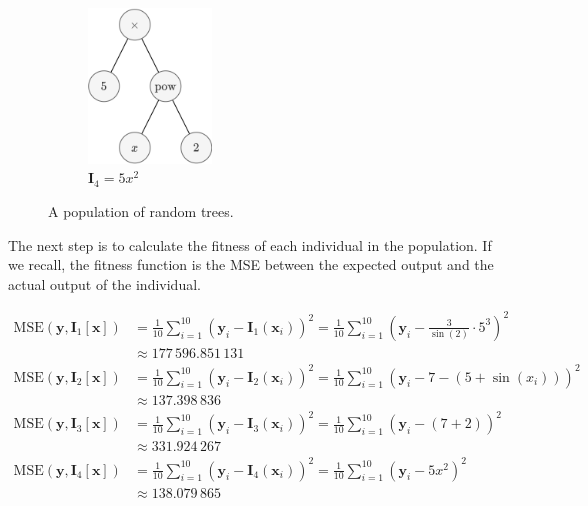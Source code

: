 \begin{figure}[ht!]
    \begin{subfigure}[t]{0.4\textwidth}
      \centering
      \includegraphics[height=4.125cm]{img/theoretical_framework/GP Initial Population 4.png}
      \caption{\(\mathbf{I}_4 = 5x^2\)}
      \label{fig:genetic_programming:initialization:population:4}
    \end{subfigure}
    \caption{A population of random trees.}
    \label{fig:genetic_programming:initialization:population}
  \end{figure}

  The next step is to calculate the fitness of each individual in the
  population.
  If we recall, the fitness function is the MSE between the expected output and
  the actual output of the individual.

  \begin{align*}
    \mathrm{MSE}(\mathbf{y}, \mathbf{I}_1[\mathbf{x}])
      & = \frac{1}{10} \sum_{i=1}^{10} (\mathbf{y}_i - \mathbf{I}_1(\mathbf{x}_i))^2
        = \frac{1}{10} \sum_{i=1}^{10} \left(
          \mathbf{y}_i - \frac{3}{\sin(2)} \cdot 5^3\right)^2 \\
      & \approx 177\,596.851\,131  \\
    \mathrm{MSE}(\mathbf{y}, \mathbf{I}_2[\mathbf{x}])
      & = \frac{1}{10} \sum_{i=1}^{10} (\mathbf{y}_i - \mathbf{I}_2(\mathbf{x}_i))^2
        = \frac{1}{10} \sum_{i=1}^{10} \left(
          \mathbf{y}_i - 7 - (5 + \sin(x_i))\right)^2 \\
      & \approx 137.398\,836  \\
    \mathrm{MSE}(\mathbf{y}, \mathbf{I}_3[\mathbf{x}])
      & = \frac{1}{10} \sum_{i=1}^{10} (\mathbf{y}_i - \mathbf{I}_3(\mathbf{x}_i))^2
        = \frac{1}{10} \sum_{i=1}^{10} \left(
          \mathbf{y}_i - (7 + 2)\right)^2 \\
      & \approx 331.924\,267 \\
    \mathrm{MSE}(\mathbf{y}, \mathbf{I}_4[\mathbf{x}])
      & = \frac{1}{10} \sum_{i=1}^{10} (\mathbf{y}_i - \mathbf{I}_4(\mathbf{x}_i))^2
        = \frac{1}{10} \sum_{i=1}^{10} \left(
          \mathbf{y}_i - 5x^2\right)^2 \\
      & \approx 138.079\,865
  \end{align*}

